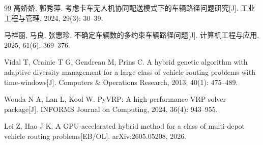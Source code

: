 \documentclass{setp-new}
\begin{document}
\begin{thebibliography}{99}
 高娇娇, 郭秀萍. 考虑卡车无人机协同配送模式下的车辆路径问题研究[J]. 工业工程与管理, 2024, 29(3): 30--39.

 马祥丽, 马良, 张惠珍. 不确定车辆数的多约束车辆路径问题[J]. 计算机工程与应用, 2025, 61(6): 369--376.

 Vidal T, Crainic T G, Gendreau M, Prins C. A hybrid genetic algorithm with adaptive diversity management for a large class of vehicle routing problems with time-windows[J]. Computers \& Operations Research, 2013, 40(1): 475--489.

 Wouda N A, Lan L, Kool W. PyVRP: A high-performance VRP solver package[J]. INFORMS Journal on Computing, 2024, 36(4): 943--955.

 Lei Z, Hao J K. A GPU-accelerated hybrid method for a class of multi-depot vehicle routing problems[EB/OL]. arXiv:2605.05208, 2026.

\end{thebibliography}
\end{document}
